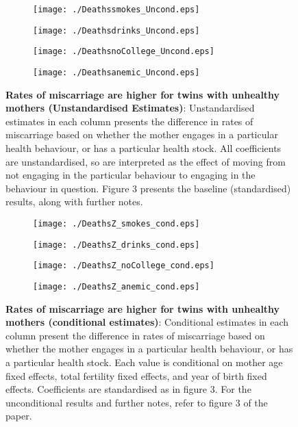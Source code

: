 \documentclass[12pt]{article}
\begin{document}
\begin{spacing}{1}
\begin{figure}[htpb!]
\begin{subfigure}{.5\textwidth}
  \texttt{[image: ./Deathssmokes\_Uncond.eps]}
\end{subfigure}%
\begin{subfigure}{.5\textwidth}
  \texttt{[image: ./Deathsdrinks\_Uncond.eps]}
\end{subfigure}
\begin{subfigure}{.5\textwidth}
  \texttt{[image: ./DeathsnoCollege\_Uncond.eps]}
\end{subfigure}%
\begin{subfigure}{.5\textwidth}
  \texttt{[image: ./Deathsanemic\_Uncond.eps]}
\end{subfigure}
\vspace{5mm}
\caption{\textbf{Rates of miscarriage are higher for twins with unhealthy mothers (Unstandardised Estimates)}: {\footnotesize Unstandardised estimates in each column presents the difference in rates of miscarriage based on whether the mother engages in a particular health behaviour, or has a particular health stock.  All coefficients are unstandardised, so are interpreted as the effect of moving from not engaging in the particular behaviour to engaging in the behaviour in question. Figure 3 presents the baseline (standardised) results, along with further notes.}}
\label{fig:miscarriageUnstand}
\end{figure}

\begin{figure}[htpb!]
\begin{subfigure}{.5\textwidth}
  \texttt{[image: ./DeathsZ\_smokes\_cond.eps]}
\end{subfigure}%
\begin{subfigure}{.5\textwidth}
  \texttt{[image: ./DeathsZ\_drinks\_cond.eps]}
\end{subfigure}
\begin{subfigure}{.5\textwidth}
  \texttt{[image: ./DeathsZ\_noCollege\_cond.eps]}
\end{subfigure}%
\begin{subfigure}{.5\textwidth}
  \texttt{[image: ./DeathsZ\_anemic\_cond.eps]}
\end{subfigure}
\vspace{5mm}
\caption{\textbf{Rates of miscarriage are higher for twins with unhealthy mothers (conditional estimates)}: {\footnotesize Conditional estimates in each column present the difference in rates of miscarriage based on whether the mother engages in a particular health behaviour, or has a particular health stock.  Each value is conditional on mother age fixed effects, total fertility fixed effects, and year of birth fixed effects. Coefficients are standardised as in figure 3. For the unconditional results and further notes, refer to figure 3 of the paper.}}
\label{fig:miscarriageCond}
\end{figure}


\end{spacing}
\end{document}

